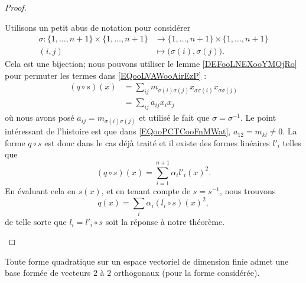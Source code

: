 \begin{proof}
\begin{subproof}
            Utilisons un petit abus de notation pour considérer
            \begin{equation}
                \begin{aligned}
                    \sigma\colon \{ 1,\ldots, n+1 \}\times \{ 1,\ldots, n+1 \}&\to \{ 1,\ldots, n+1 \}\times \{ 1,\ldots, n+1 \} \\
                    (i,j)&\mapsto \big(\sigma(i), \sigma(j)\big). 
                \end{aligned}
            \end{equation}
            Cela est une bijection; nous pouvons utiliser le lemme \ref{DEFooLNEXooYMQjRo} pour permuter les termes dans \eqref{EQooLVAWooAirEzP} :      
            \begin{subequations}
                \begin{align}
                    (q\circ s)(x)&=\sum_{ij}m_{\sigma(i)\sigma(j)}x_{\sigma\sigma(i)}x_{\sigma\sigma(j)}\\
                    &=\sum_{ij}a_{ij}x_ix_j     \label{EQooPCTCooFnMWat}
                \end{align}
            \end{subequations}
            où nous avons posé \( a_{ij}=m_{\sigma(i)\sigma(j)}\) et utilisé le fait que \( \sigma=\sigma^{-1}\). Le point intéressant de l'histoire est que dans \eqref{EQooPCTCooFnMWat}, \( a_{12}=m_{kl}\neq 0\). La forme \( q\circ s\) est donc dans le cas déjà traité et il existe des formes linéaires \( l'_i\) telles que
            \begin{equation}
                (q\circ s)(x)=\sum_{i=1}^{n+1}\alpha_il'_i(x)^2.
            \end{equation}
            En évaluant cela en \( s(x)\), et en tenant compte de \( s=s^{-1}\), nous trouvons
            \begin{equation}
                q(x)=\sum_i\alpha_i(l_i\circ s)(x)^2,
            \end{equation}
            de telle sorte que \( l_i=l'_i\circ s\) soit la réponse à notre théorème.
    \end{subproof}
\end{proof}

\begin{theorem}       \label{THOooIDMPooIMwkqB}
    Toute forme quadratique sur un espace vectoriel de dimension finie admet une base formée de vecteurs \( 2\) à \( 2\) orthogonaux (pour la forme considérée).
\end{theorem}

